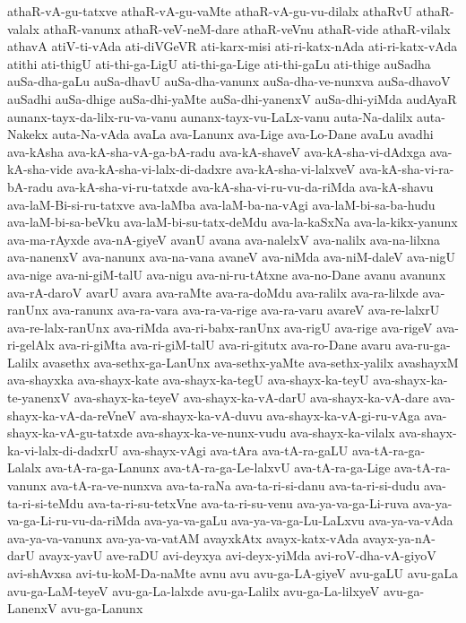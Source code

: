 {athaR-vA-gu-tatxve
athaR-vA-gu-vaMte
athaR-vA-gu-vu-dilalx
athaRvU
athaR-valalx
athaR-vanunx
athaR-veV-neM-dare
athaR-veVnu
athaR-vide
athaR-vilalx
athavA
atiV-ti-vAda
ati-diVGeVR
ati-karx-misi
ati-ri-katx-nAda
ati-ri-katx-vAda
atithi
ati-thigU
ati-thi-ga-LigU
ati-thi-ga-Lige
ati-thi-gaLu
ati-thige
auSadha
auSa-dha-gaLu
auSa-dhavU
auSa-dha-vanunx
auSa-dha-ve-nunxva
auSa-dhavoV
auSadhi
auSa-dhige
auSa-dhi-yaMte
auSa-dhi-yanenxV
auSa-dhi-yiMda
audAyaR
aunanx-tayx-da-lilx-ru-va-vanu
aunanx-tayx-vu-LaLx-vanu
auta-Na-dalilx
auta-Nakekx
auta-Na-vAda
avaLa
ava-Lanunx
ava-Lige
ava-Lo-Dane
avaLu
avadhi
ava-kAsha
ava-kA-sha-vA-ga-bA-radu
ava-kA-shaveV
ava-kA-sha-vi-dAdxga
ava-kA-sha-vide
ava-kA-sha-vi-lalx-di-dadxre
ava-kA-sha-vi-lalxveV
ava-kA-sha-vi-ra-bA-radu
ava-kA-sha-vi-ru-tatxde
ava-kA-sha-vi-ru-vu-da-riMda
ava-kA-shavu
ava-laM-Bi-si-ru-tatxve
ava-laMba
ava-laM-ba-na-vAgi
ava-laM-bi-sa-ba-hudu
ava-laM-bi-sa-beVku
ava-laM-bi-su-tatx-deMdu
ava-la-kaSxNa
ava-la-kikx-yanunx
ava-ma-rAyxde
ava-nA-giyeV
avanU
avana
ava-nalelxV
ava-nalilx
ava-na-lilxna
ava-nanenxV
ava-nanunx
ava-na-vana
avaneV
ava-niMda
ava-niM-daleV
ava-nigU
ava-nige
ava-ni-giM-talU
ava-nigu
ava-ni-ru-tAtxne
ava-no-Dane
avanu
avanunx
ava-rA-daroV
avarU
avara
ava-raMte
ava-ra-doMdu
ava-ralilx
ava-ra-lilxde
ava-ranUnx
ava-ranunx
ava-ra-vara
ava-ra-va-rige
ava-ra-varu
avareV
ava-re-lalxrU
ava-re-lalx-ranUnx
ava-riMda
ava-ri-babx-ranUnx
ava-rigU
ava-rige
ava-rigeV
ava-ri-gelAlx
ava-ri-giMta
ava-ri-giM-talU
ava-ri-gitutx
ava-ro-Dane
avaru
ava-ru-ga-Lalilx
avasethx
ava-sethx-ga-LanUnx
ava-sethx-yaMte
ava-sethx-yalilx
avashayxM
ava-shayxka
ava-shayx-kate
ava-shayx-ka-tegU
ava-shayx-ka-teyU
ava-shayx-ka-te-yanenxV
ava-shayx-ka-teyeV
ava-shayx-ka-vA-darU
ava-shayx-ka-vA-dare
ava-shayx-ka-vA-da-reVneV
ava-shayx-ka-vA-duvu
ava-shayx-ka-vA-gi-ru-vAga
ava-shayx-ka-vA-gu-tatxde
ava-shayx-ka-ve-nunx-vudu
ava-shayx-ka-vilalx
ava-shayx-ka-vi-lalx-di-dadxrU
ava-shayx-vAgi
ava-tAra
ava-tA-ra-gaLU
ava-tA-ra-ga-Lalalx
ava-tA-ra-ga-Lanunx
ava-tA-ra-ga-Le-lalxvU
ava-tA-ra-ga-Lige
ava-tA-ra-vanunx
ava-tA-ra-ve-nunxva
ava-ta-raNa
ava-ta-ri-si-danu
ava-ta-ri-si-dudu
ava-ta-ri-si-teMdu
ava-ta-ri-su-tetxVne
ava-ta-ri-su-venu
ava-ya-va-ga-Li-ruva
ava-ya-va-ga-Li-ru-vu-da-riMda
ava-ya-va-gaLu
ava-ya-va-ga-Lu-LaLxvu
ava-ya-va-vAda
ava-ya-va-vanunx
ava-ya-va-vatAM
avayxkAtx
avayx-katx-vAda
avayx-ya-nA-darU
avayx-yavU
ave-raDU
avi-deyxya
avi-deyx-yiMda
avi-roV-dha-vA-giyoV
avi-shAvxsa
avi-tu-koM-Da-naMte
avnu
avu
avu-ga-LA-giyeV
avu-gaLU
avu-gaLa
avu-ga-LaM-teyeV
avu-ga-La-lalxde
avu-ga-Lalilx
avu-ga-La-lilxyeV
avu-ga-LanenxV
avu-ga-Lanunx
}
